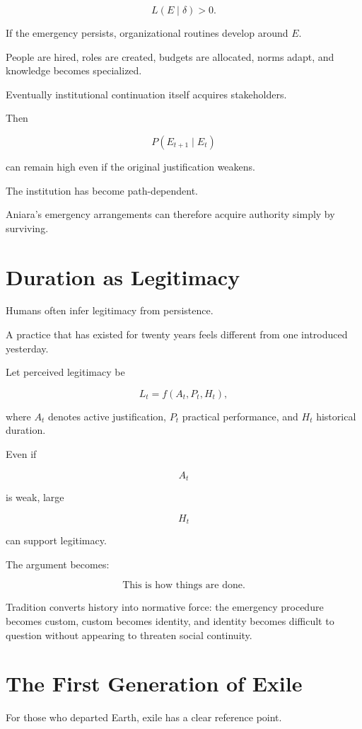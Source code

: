 \documentclass[11pt,oneside]{book}
\theoremstyle{definition}
\theoremstyle{remark}
\begin{document}
\[
L(E\mid\delta)>0.
\]

If the emergency persists, organizational routines develop around \(E\).

People are hired, roles are created, budgets are allocated, norms adapt, and knowledge becomes specialized.

Eventually institutional continuation itself acquires stakeholders.

Then

\[
P(E_{t+1}\mid E_t)
\]

can remain high even if the original justification weakens.

The institution has become path-dependent.

Aniara's emergency arrangements can therefore acquire authority simply by surviving.

\section{Duration as Legitimacy}

Humans often infer legitimacy from persistence.

A practice that has existed for twenty years feels different from one introduced yesterday.

Let perceived legitimacy be

\[
L_t
=
f(A_t,P_t,H_t),
\]

where \(A_t\) denotes active justification, \(P_t\) practical performance, and \(H_t\) historical duration.

Even if

\[
A_t
\]

is weak, large

\[
H_t
\]

can support legitimacy.

The argument becomes:

\[
\text{This is how things are done.}
\]

Tradition converts history into normative force: the emergency procedure becomes custom, custom becomes identity, and identity becomes difficult to question without appearing to threaten social continuity.

\section{The First Generation of Exile}

For those who departed Earth, exile has a clear reference point.
\end{document}
